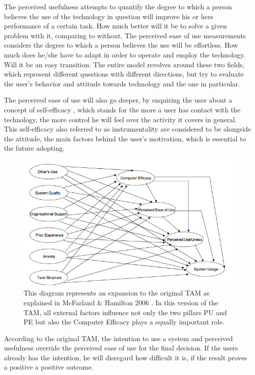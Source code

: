 The perceived usefulness attempts to quantify the degree to which a person believes
the use of the technology in question will improve his or hers performance of a 
certain task. How much better will it be to solve a given problem with it, comparing
to without.
The perceived ease of use measurements considers the degree to which a person 
believes the use will be effortless. How much does he/she have to adapt in order 
to operate and employ the technology. Will it be an easy transition.
The entire model revolves around these two fields, which represent different questions
with different directions, but try to evaluate the user's behavior and attitude
towards technology and the one in particular.

The perceived ease of use will also go deeper, by enquiring the user about a 
concept of self-efficacy \cite{lepper_1985}, which stands for the more a user has
contact with the technology, the more control he will feel over the activity it 
covers in general. This self-efficacy also referred to as instrumentality are 
considered to be alongside the attitude, the main factors behind the user's 
motivation, which is essential to the future adopting.

\begin{figure}
    \centering
    \includegraphics[width=16cm]{images/tam2.png}
    \caption{This diagram represents an expansion to the original TAM as explained in McFarland \& Hamilton 2006 \cite{mcfarland_hamilton_2006}. In this version of the TAM, all external factors influence not only 
    the two pillars PU and PE but also the Computer Efficacy plays a equally important role.
    }
    \label{fig:tam2}
\end{figure}

According to the original TAM, the intention to use a system and perceived usefulness
override the perceived ease of use for the final decision. If the users already has
the intention, he will disregard how difficult it is, if the result proves a positive
a positive outcome.




